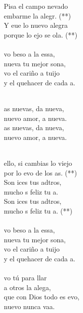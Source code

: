 \begin{cancion}%
	Pisa el campo nevado\\
	embarme la alegr. (**) \\
	Y eue lo nuevo  alegra \\
	porque lo ejo se ola. (**)\\
\jump\\
	vo beso a la essa, \\
	nueva tu mejor sona,\\
	vo el cariño a tuijo \\
	y el quehacer de cada a.\\\jump\\
	\begin{chorus}%
	as nuevas, da nueva, \\
	nuevo amor, a nueva.\\
	as nuevas, da nueva, \\
	nuevo amor, a nueva.\\
	\end{chorus}%
	\jump\\
	 ello, si cambias lo viejo \\
	por lo evo de los as. (**)\\
	Son ices tus adtros, \\
	mucho s feliz tu a. \\
	Son ices tus adtros, \\
	mucho s feliz tu a. (**) \\
\jump\\
	vo beso a la essa, \\
	nueva tu mejor sona,\\
	vo el cariño a tuijo \\
	y el quehacer de cada a.\\
\jump\\
	vo tú para llar \\
	a otros la alega,\\
	que con Dios todo es evo, \\
	nuevo nunca vaa.\\
\end{cancion}%

